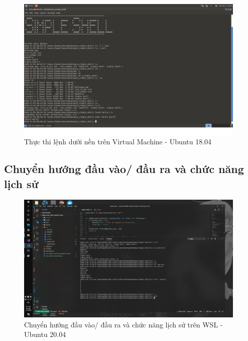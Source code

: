 \documentclass{article}
\begin{document}
\begin{figure}[H]
\centering
\includegraphics[width=0.98\textwidth]{virtual_machine_background.png}
\caption{Thực thi lệnh dưới nền trên Virtual Machine - Ubuntu 18.04}
\end{figure}

\subsection{Chuyển hướng đầu vào/ đầu ra và chức năng lịch sử}

\begin{figure}[H]
\centering
\includegraphics[width=0.98\textwidth]{wsl_history_io_direct.png}
\caption{Chuyển hướng đầu vào/ đầu ra và chức năng lịch sử trên WSL - Ubuntu 20.04}
\end{figure}
\end{document}
